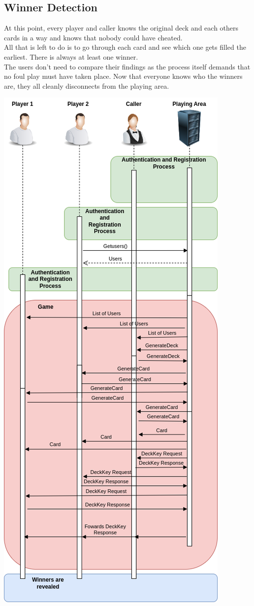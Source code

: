 \documentclass[11pt]{article}
\begin{document}
\subsection{Winner Detection}
At this point, every player and caller knows the original deck and each others cards in a way and knows that nobody could have cheated. \\
All that is left to do is to go through each card and see which one gets filled the earliest. There is always at least one winner. \\
The users don’t need to compare their findings as the process itself demands that no foul play must have taken place. Now that everyone knows who the winners are, they all cleanly disconnects from the playing area.
\begin{center}
\includegraphics[scale=0.6]{flowchart.png}
\end{center}
\end{document}
